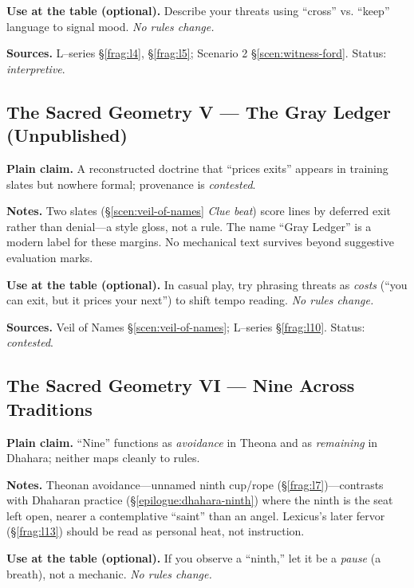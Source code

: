 \documentclass[11pt]{article}
\numberwithin{equation}{section} %
\theoremstyle{plain} %
\theoremstyle{definition} %
\theoremstyle{remark} %
\begin{document}
\medskip
\noindent\textbf{Use at the table (optional).} Describe your threats using “cross” vs. “keep” language to signal mood. \emph{No rules change.}

\medskip
\noindent\textbf{Sources.} L–series \S\ref{frag:l4}, \S\ref{frag:l5}; Scenario 2 \S\ref{scen:witness-ford}. Status: \emph{interpretive}.

\subsection{The Sacred Geometry V — The Gray Ledger (Unpublished)}
\label{geometry:gray-ledger}

\noindent\textbf{Plain claim.} A reconstructed doctrine that “prices exits” appears in training slates but nowhere formal; provenance is \emph{contested}.

\medskip
\noindent\textbf{Notes.} Two slates (\S\ref{scen:veil-of-names} \emph{Clue beat}) score lines by deferred exit rather than denial—a style gloss, not a rule. The name “Gray Ledger” is a modern label for these margins. No mechanical text survives beyond suggestive evaluation marks.

\medskip
\noindent\textbf{Use at the table (optional).} In casual play, try phrasing threats as \emph{costs} (“you can exit, but it prices your next”) to shift tempo reading. \emph{No rules change.}

\medskip
\noindent\textbf{Sources.} Veil of Names \S\ref{scen:veil-of-names}; L–series \S\ref{frag:l10}. Status: \emph{contested}.

\subsection{The Sacred Geometry VI — Nine Across Traditions}
\label{geometry:nine}

\noindent\textbf{Plain claim.} “Nine” functions as \emph{avoidance} in Theona and as \emph{remaining} in Dhahara; neither maps cleanly to rules.

\medskip
\noindent\textbf{Notes.} Theonan avoidance—unnamed ninth cup/rope (\S\ref{frag:l7})—contrasts with Dhaharan practice (\S\ref{epilogue:dhahara-ninth}) where the ninth is the seat left open, nearer a contemplative “saint” than an angel. Lexicus’s later fervor (\S\ref{frag:l13}) should be read as personal heat, not instruction.

\medskip
\noindent\textbf{Use at the table (optional).} If you observe a “ninth,” let it be a \emph{pause} (a breath), not a mechanic. \emph{No rules change.}
\end{document}
